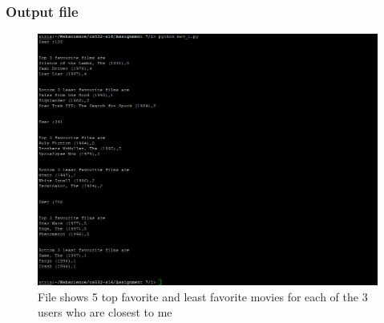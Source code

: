 \subsubsection{Output file}
\begin{figure}[ht]    
    \begin{center}
        \includegraphics[scale=0.7]{topandbot3.png}
        \caption{File shows 5 top favorite and least favorite movies for each of the 3 users who are closest to me}
        \label{output1}
    \end{center}
\end{figure}
\newpage